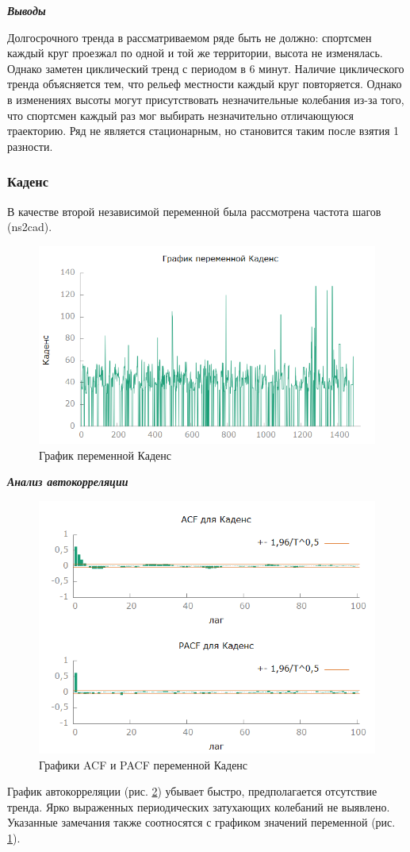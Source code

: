 \documentclass[a4paper,12pt]{article}
\begin{document}
\textbf{\textit{Выводы}}

Долгосрочного тренда в рассматриваемом ряде быть не должно: спортсмен каждый круг проезжал по одной и той же территории, высота не изменялась. Однако заметен циклический тренд с периодом в 6 минут. Наличие циклического тренда объясняется тем, что рельеф местности каждый круг повторяется. Однако в изменениях высоты могут присутствовать незначительные колебания из-за того, что спортсмен каждый раз мог выбирать незначительно отличающуюся траекторию. Ряд не является стационарным, но становится таким после взятия 1 разности.

\subsubsection{Каденс}

В качестве второй независимой переменной была рассмотрена частота шагов (ns2cad).
\begin{figure}[H]
	\centering
	\includegraphics[width=0.5\linewidth]{../[graphics]/cad_graph}
	\caption{График переменной Каденс}
	\label{fig:cad_graph}
\end{figure}

\textbf{\textit{Анализ автокорреляции}}

\begin{figure}[H]
	\centering
	\includegraphics[width=0.5\linewidth]{../[graphics]/cad_acf_100}
	\caption{Графики ACF и PACF переменной Каденс}
	\label{fig:cad_acf_100}
\end{figure}

График автокорреляции (рис. \ref{fig:cad_acf_100}) убывает быстро, предполагается отсутствие тренда. Ярко выраженных периодических затухающих колебаний не выявлено. Указанные замечания также соотносятся с графиком значений переменной (рис. \ref{fig:cad_graph}).
\end{document}
